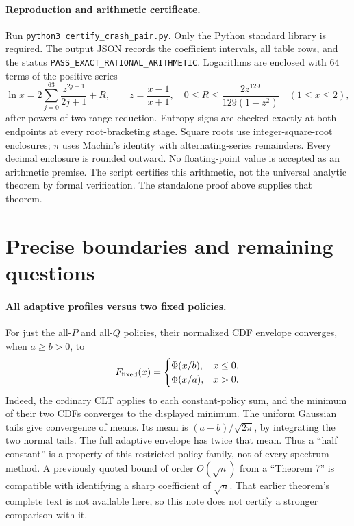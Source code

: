 \documentclass[11pt,a4paper]{article}
\begin{document}
\paragraph{Reproduction and arithmetic certificate.}
Run \texttt{python3 certify\_crash\_pair.py}. Only the Python standard
library is required. The output JSON records the coefficient intervals,
all table rows, and the status \texttt{PASS\_EXACT\_RATIONAL\_ARITHMETIC}.
Logarithms are enclosed with 64 terms of the positive series
\[
\ln x=2\sum_{j=0}^{63}\frac{z^{2j+1}}{2j+1}+R,
\qquad z=\frac{x-1}{x+1},\quad
0\le R\le\frac{2z^{129}}{129(1-z^2)}\quad(1\le x\le2),
\]
after powers-of-two range reduction. Entropy signs are checked exactly
at both endpoints at every root-bracketing stage. Square roots use
integer-square-root enclosures; $\pi$ uses Machin's identity with
alternating-series remainders. Every decimal enclosure is rounded
outward. No floating-point value is accepted as an arithmetic premise.
The script certifies this arithmetic, not the universal analytic theorem
by formal verification. The standalone proof above supplies that theorem.


\section{Precise boundaries and remaining questions}\label{sec:open}
\paragraph{All adaptive profiles versus two fixed policies.}
For just the all-$P$ and all-$Q$ policies, their normalized CDF envelope
converges, when $a\ge b>0$, to
\[
F_{\rm fixed}(x)=
\begin{cases}\Phi(x/b),&x\le0,\\\Phi(x/a),&x>0.\end{cases}
\]
Indeed, the ordinary CLT applies to each constant-policy sum, and the
minimum of their two CDFs converges to the displayed minimum. The
uniform Gaussian tails give convergence of means. Its mean is
$(a-b)/\sqrt{2\pi}$, by integrating the two normal tails. The full
adaptive envelope has twice that mean. Thus a ``half constant'' is a
property of this restricted policy family, not of every spectrum method.
A previously quoted bound of order $O(\sqrt n)$ from a ``Theorem 7''
is compatible with identifying a sharp coefficient of $\sqrt n$.
That earlier theorem's complete text is not available here, so this
note does not certify a stronger comparison with it.
\end{document}
